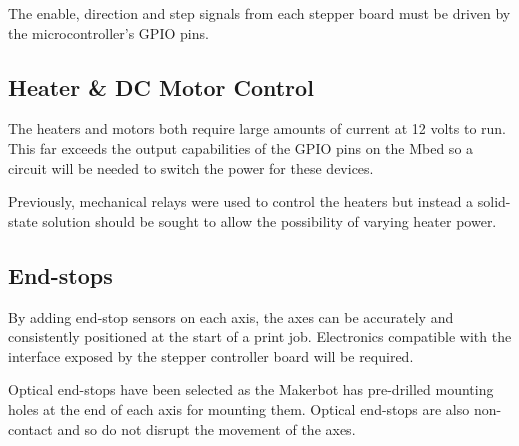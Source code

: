 			The enable, direction and step signals from each stepper board must be
			driven by the microcontroller's GPIO pins.
		
		\subsection{Heater \& DC Motor Control}
			
			The heaters and motors both require large amounts of current at 12 volts
			to run. This far exceeds the output capabilities of the GPIO pins on the
			Mbed so a circuit will be needed to switch the power for these devices.
			
			Previously, mechanical relays were used to control the heaters but instead
			a solid-state solution should be sought to allow the possibility of varying
			heater power.
		
		\subsection{End-stops}
			
			By adding end-stop sensors on each axis, the axes can be accurately and
			consistently positioned at the start of a print job. Electronics
			compatible with the interface exposed by the stepper controller board will
			be required.
			
			Optical end-stops have been selected as the Makerbot has pre-drilled
			mounting holes at the end of each axis for mounting them.  Optical
			end-stops are also non-contact and so do not disrupt the movement of the
			axes.
